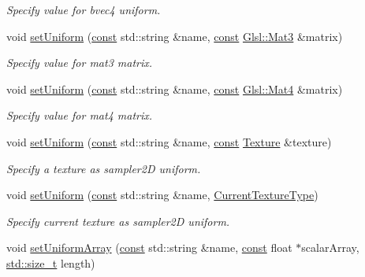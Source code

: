 \begin{DoxyCompactItemize}
\begin{DoxyCompactList}\small\item\em Specify value for {\ttfamily bvec4} uniform. \end{DoxyCompactList}\item 
void \hyperlink{classsf_1_1_shader_ac1198ae0152d439bc05781046883e281}{set\-Uniform} (\hyperlink{term__entry_8h_a57bd63ce7f9a353488880e3de6692d5a}{const} std\-::string \&name, \hyperlink{term__entry_8h_a57bd63ce7f9a353488880e3de6692d5a}{const} \hyperlink{namespacesf_1_1_glsl_a1bf4595b60b08c79473a882e2c1dbff8}{Glsl\-::\-Mat3} \&matrix)
\begin{DoxyCompactList}\small\item\em Specify value for {\ttfamily mat3} matrix. \end{DoxyCompactList}\item 
void \hyperlink{classsf_1_1_shader_aca5c55c4a3b23d21e33dbdaab7990755}{set\-Uniform} (\hyperlink{term__entry_8h_a57bd63ce7f9a353488880e3de6692d5a}{const} std\-::string \&name, \hyperlink{term__entry_8h_a57bd63ce7f9a353488880e3de6692d5a}{const} \hyperlink{namespacesf_1_1_glsl_aab545f0a373a3ea8ad145811b747f3e4}{Glsl\-::\-Mat4} \&matrix)
\begin{DoxyCompactList}\small\item\em Specify value for {\ttfamily mat4} matrix. \end{DoxyCompactList}\item 
void \hyperlink{classsf_1_1_shader_a7806a29ffbd0ee9251256a9e7265d479}{set\-Uniform} (\hyperlink{term__entry_8h_a57bd63ce7f9a353488880e3de6692d5a}{const} std\-::string \&name, \hyperlink{term__entry_8h_a57bd63ce7f9a353488880e3de6692d5a}{const} \hyperlink{classsf_1_1_texture}{Texture} \&texture)
\begin{DoxyCompactList}\small\item\em Specify a texture as {\ttfamily sampler2\-D} uniform. \end{DoxyCompactList}\item 
void \hyperlink{classsf_1_1_shader_ab18f531e1f726b88fec1cf5a1e6af26d}{set\-Uniform} (\hyperlink{term__entry_8h_a57bd63ce7f9a353488880e3de6692d5a}{const} std\-::string \&name, \hyperlink{structsf_1_1_shader_1_1_current_texture_type}{Current\-Texture\-Type})
\begin{DoxyCompactList}\small\item\em Specify current texture as {\ttfamily sampler2\-D} uniform. \end{DoxyCompactList}\item 
void \hyperlink{classsf_1_1_shader_a731d3b9953c50fe7d3fb03340b97deff}{set\-Uniform\-Array} (\hyperlink{term__entry_8h_a57bd63ce7f9a353488880e3de6692d5a}{const} std\-::string \&name, \hyperlink{term__entry_8h_a57bd63ce7f9a353488880e3de6692d5a}{const} float $\ast$scalar\-Array, \hyperlink{nc__alloc_8h_a7b60c5629e55e8ec87a4547dd4abced4}{std\-::size\-\_\-t} length)

\end{DoxyCompactItemize}
